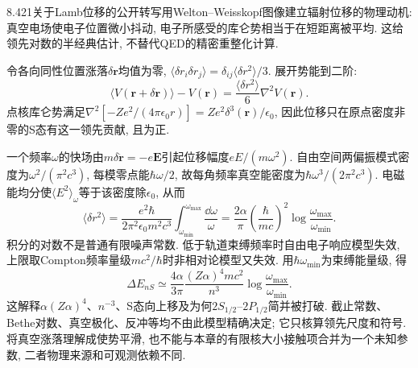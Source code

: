 8.421关于Lamb位移的公开转写用Welton--Weisskopf图像建立辐射位移的物理动机: 真空电场使电子位置微小抖动, 电子所感受的库仑势相当于在短距离被平均. 这给领先对数的半经典估计, 不替代QED的精密重整化计算.

令各向同性位置涨落$\delta\mathbf r$均值为零, $\langle\delta r_i\delta r_j\rangle=\delta_{ij}\langle\delta r^2\rangle/3$. 展开势能到二阶:
\[\langle V(\mathbf r+\delta\mathbf r)\rangle-V(\mathbf r)
 =\frac{\langle\delta r^2\rangle}{6}\nabla^2V(\mathbf r).\]
点核库仑势满足$\nabla^2[-Ze^2/(4\pi\epsilon_0r)]=Ze^2\delta^3(\mathbf r)/\epsilon_0$, 因此位移只在原点密度非零的S态有这一领先贡献, 且为正.

一个频率$\omega$的快场由$m\delta\ddot{\mathbf r}=-e\mathbf E$引起位移幅度$eE/(m\omega^2)$. 自由空间两偏振模式密度为$\omega^2/(\pi^2c^3)$, 每模零点能$\hbar\omega/2$, 故每角频率真空能密度为$\hbar\omega^3/(2\pi^2c^3)$. 电磁能均分使$\langle E^2\rangle_\omega$等于该密度除$\epsilon_0$, 从而
\[\langle\delta r^2\rangle=
 \frac{e^2\hbar}{2\pi^2\epsilon_0m^2c^3}
 \int_{\omega_{\min}}^{\omega_{\max}}\frac{\dd\omega}{\omega}
 =\frac{2\alpha}{\pi}\left(\frac{\hbar}{mc}\right)^2
 \log\frac{\omega_{\max}}{\omega_{\min}}.\]
积分的对数不是普通有限噪声常数. 低于轨道束缚频率时自由电子响应模型失效, 上限取Compton频率量级$mc^2/\hbar$时非相对论模型又失效. 用$\hbar\omega_{\min}$为束缚能量级, 得
\[\Delta E_{nS}\simeq
 \frac{4\alpha}{3\pi}\frac{(Z\alpha)^4mc^2}{n^3}
 \log\frac{\omega_{\max}}{\omega_{\min}}.\]
这解释$\alpha(Z\alpha)^4$、$n^{-3}$、S态向上移及为何$2S_{1/2}$--$2P_{1/2}$简并被打破. 截止常数、Bethe对数、真空极化、反冲等均不由此模型精确决定; 它只核算领先尺度和符号. 将真空涨落理解成使势平滑, 也不能与本章的有限核大小接触项合并为一个未知参数, 二者物理来源和可观测依赖不同.
